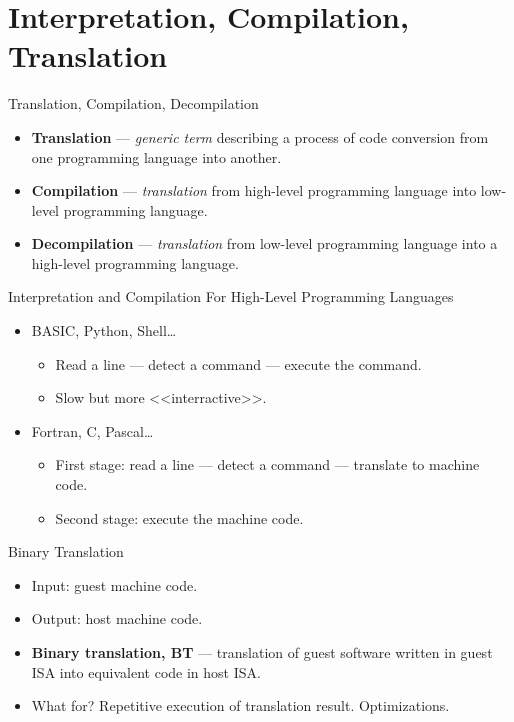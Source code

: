 \section{Interpretation, Compilation, Translation}

\begin{frame}{Translation, Compilation, Decompilation}
\pause
\begin{itemize}
\item \textbf{Translation} --- \textit{generic term} describing a process of
  code conversion from one programming language into another.
\item \textbf{Compilation} --- \textit{translation} from high-level programming
  language into low-level programming language.
\item \textbf{Decompilation} --- \textit{translation} from low-level programming
  language into a high-level programming language.
\end{itemize}
\end{frame}

\begin{frame}{Interpretation and Compilation For High-Level Programming Languages}
\begin{itemize}
\item BASIC, Python, Shell\dots
  \begin{itemize}
  \item Read a line --- detect a command --- execute the command.
  \item Slow but more <<interractive>>.
  \end{itemize}
\item Fortran, C, Pascal\dots
  \begin{itemize}
  \item First stage: read a line --- detect a command --- translate to machine code.
  \item Second stage: execute the machine code.
  \end{itemize}
\end{itemize}
\end{frame}

\begin{frame}{Binary Translation}
\begin{itemize}
\item Input: guest machine code.
\item Output: host machine code.
\item \textbf{Binary translation, BT} --- translation of guest software written in
  guest ISA into equivalent code in host ISA.
\item What for? \pause Repetitive execution of translation result. Optimizations.
\end{itemize}
\end{frame}

